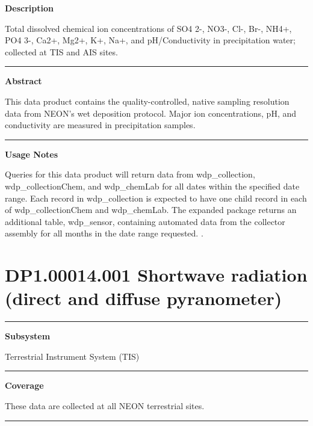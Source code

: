 \documentclass[]{article}
\begin{document}
\textbf{Description}

Total dissolved chemical ion concentrations of SO4 2-, NO3-, Cl-, Br-,
NH4+, PO4 3-, Ca2+, Mg2+, K+, Na+, and pH/Conductivity in precipitation
water; collected at TIS and AIS sites.

\begin{center}\rule{0.5\linewidth}{\linethickness}\end{center}

\textbf{Abstract}

This data product contains the quality-controlled, native sampling
resolution data from NEON's wet deposition protocol. Major ion
concentrations, pH, and conductivity are measured in precipitation
samples.

\begin{center}\rule{0.5\linewidth}{\linethickness}\end{center}

\textbf{Usage Notes}

Queries for this data product will return data from wdp\_collection,
wdp\_collectionChem, and wdp\_chemLab for all dates within the specified
date range. Each record in wdp\_collection is expected to have one child
record in each of wdp\_collectionChem and wdp\_chemLab. The expanded
package returns an additional table, wdp\_sensor, containing automated
data from the collector assembly for all months in the date range
requested. \newpage
.

\section{DP1.00014.001 Shortwave radiation (direct and diffuse
pyranometer)}\label{dp1.00014.001-shortwave-radiation-direct-and-diffuse-pyranometer}

\begin{center}\rule{0.5\linewidth}{\linethickness}\end{center}

\textbf{Subsystem}

Terrestrial Instrument System (TIS)

\begin{center}\rule{0.5\linewidth}{\linethickness}\end{center}

\textbf{Coverage}

These data are collected at all NEON terrestrial sites.

\begin{center}\rule{0.5\linewidth}{\linethickness}\end{center}
\end{document}
